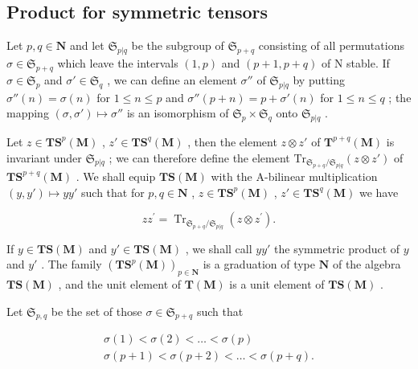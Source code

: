 \subsection{Product for symmetric tensors}

Let \(p, q \in \mathbf{N}\) and let \(\mathfrak{S}_{p|q}\) be the subgroup of \(\mathfrak{S}_{p+q}\) consisting of all permutations \(\sigma \in \mathfrak{S}_{p+q}\) which leave the intervals \((1, p)\) and \((p+1, p+q)\) of N stable. If \(\sigma \in \mathfrak{S}_p\) and \(\sigma' \in \mathfrak{S}_q\) , we can define an element \(\sigma''\) of \(\mathfrak{S}_{p|q}\) by putting \(\sigma''(n) = \sigma(n)\) for \(1 \leqslant n \leqslant p\) and \(\sigma''(p+n) = p + \sigma'(n)\) for \(1 \leqslant n \leqslant q\) ; the mapping \((\sigma, \sigma') \mapsto \sigma''\) is an isomorphism of \(\mathfrak{S}_p \times \mathfrak{S}_q\) onto \(\mathfrak{S}_{p|q}\) .

Let \(z \in \mathbf{TS}^p(\mathbf{M})\) , \(z' \in \mathbf{TS}^q(\mathbf{M})\) , then the element \(z \otimes z'\) of \(\mathbf{T}^{p + q}(\mathbf{M})\) is invariant under \(\mathfrak{S}_{p|q}\) ; we can therefore define the element \(\mathrm{Tr}_{\mathfrak{S}_{p + q}/\mathfrak{S}_{p|q}}(z \otimes z')\) of \(\mathbf{TS}^{p + q}(\mathbf{M})\) . We shall equip \(\mathbf{TS}(\mathbf{M})\) with the A-bilinear multiplication \((y, y') \mapsto yy'\) such that for \(p, q \in \mathbf{N}\) , \(z \in \mathbf{TS}^p(\mathbf{M})\) , \(z' \in \mathbf{TS}^q(\mathbf{M})\) we have

\[
z z ^ {\prime} = \operatorname{Tr} _ {\mathfrak {S} _ {p + q} / \mathfrak {S} _ {p | q}} (z \otimes z ^ {\prime}).\tag{4}
\]

If \(y \in \mathbf{TS}(\mathbf{M})\) and \(y' \in \mathbf{TS}(\mathbf{M})\) , we shall call \(yy'\) the symmetric product of \(y\) and \(y'\) . The family \((\mathbf{TS}^p(\mathbf{M}))_{p \in \mathbf{N}}\) is a graduation of type \(\mathbf{N}\) of the algebra \(\mathbf{TS}(\mathbf{M})\) , and the unit element of \(\mathbf{T}(\mathbf{M})\) is a unit element of \(\mathbf{TS}(\mathbf{M})\) .

Let \(\mathfrak{S}_{p,q}\) be the set of those \(\sigma \in \mathfrak{S}_{p + q}\) such that

\[
\begin{array}{l} \sigma (1) <   \sigma (2) <   \ldots <   \sigma (p) \\ \sigma (p + 1) <   \sigma (p + 2) <   \ldots <   \sigma (p + q). \end{array}
\]

